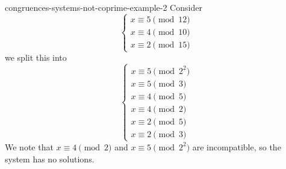 \documentclass[preview]{standalone}
\begin{document}
\begin{snippetexample}{congruences-systems-not-coprime-example-2}{}
    Consider
    \[
        \begin{cases}
            x \equiv 5 \pmod{12} \\
            x \equiv 4 \pmod{10} \\
            x \equiv 2 \pmod{15}
        \end{cases}
    \]
    we split this into
    \[
        \begin{cases}
            x \equiv 5 \pmod{2^2} \\
            x \equiv 5 \pmod{3} \\
            x \equiv 4 \pmod{5} \\
            x \equiv 4 \pmod{2} \\
            x \equiv 2 \pmod{5} \\
            x \equiv 2 \pmod{3}
        \end{cases}
    \]
    We note that \(x \equiv 4 \pmod{2}\) and \(x \equiv 5 \pmod{2^2}\)
    are incompatible, so the system has no solutions.
\end{snippetexample}
\end{document}

